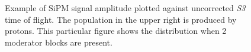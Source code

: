 \begin{figure}[h]
  \begin{adjustbox}{max totalsize={.7\textwidth}, center}
    
  \end{adjustbox}
  \caption{Example of SiPM signal amplitude plotted against uncorrected \textit{S3} time of flight. The population in the upper right is produced by protons. This particular figure shows the distribution when 2 moderator blocks are present.}
  \label{fig:TvsA}
\end{figure}

